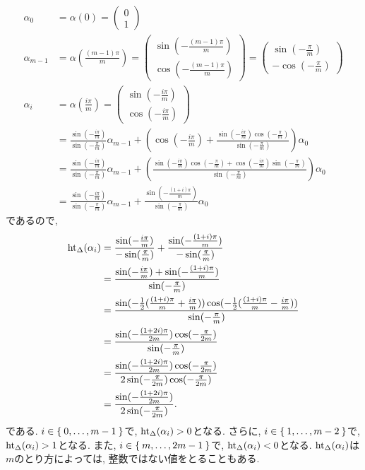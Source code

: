 \begin{align*}
  \alpha_0&=\alpha(0)=\begin{pmatrix}0\\1\end{pmatrix}\\
  \alpha_{m-1}&=\alpha(\frac{(m-1)\pi}{m})=
  \begin{pmatrix}\sin(-\frac{(m-1)\pi}{m})\\\cos(-\frac{(m-1)\pi}{m})\end{pmatrix}=
\begin{pmatrix}\sin(-\frac{\pi}{m})\\-\cos(-\frac{\pi}{m})\end{pmatrix}
  \\
  \alpha_{i}&=\alpha(\frac{i\pi}{m})=
  \begin{pmatrix}\sin(-\frac{i\pi}{m})\\\cos(-\frac{i\pi}{m})\end{pmatrix}\\
  &=
  \frac{\sin(-\frac{i\pi}{m})}{\sin(-\frac{\pi}{m})}\alpha_{m-1}
  +
  (\cos(-\frac{i\pi}{m})+\frac{\sin(-\frac{i\pi}{m})\cos(-\frac{\pi}{m})}{\sin(-\frac{\pi}{m})})\alpha_{0}\\
  &=
  \frac{\sin(-\frac{i\pi}{m})}{\sin(-\frac{\pi}{m})}\alpha_{m-1}
  +
  (\frac{\sin(-\frac{i\pi}{m})\cos(-\frac{\pi}{m})+\cos(-\frac{i\pi}{m})\sin(-\frac{\pi}{m})}{\sin(-\frac{\pi}{m})})\alpha_{0}\\
  &=
  \frac{\sin(-\frac{i\pi}{m})}{\sin(-\frac{\pi}{m})}\alpha_{m-1}
  +
  \frac{\sin(-\frac{(1+i)\pi}{m})}{\sin(-\frac{\pi}{m})}\alpha_{0}
\end{align*}
であるので,
\begin{align*}
  \operatorname{ht}_{\Delta}(\alpha_i)
  &=
  \frac{\sin(-\frac{i\pi}{m})}{-\sin(\frac{\pi}{m})}
  +
  \frac{\sin(-\frac{(1+i)\pi}{m})}{-\sin(\frac{\pi}{m})}\\
  &=
  \frac{\sin(-\frac{i\pi}{m})+\sin(-\frac{(1+i)\pi}{m})}{\sin(-\frac{\pi}{m})}\\
  &=
  \frac{\sin(-\frac{1}{2}(\frac{(1+i)\pi}{m}+\frac{i\pi}{m}))\cos(-\frac{1}{2}(\frac{(1+i)\pi}{m}-\frac{i\pi}{m}))}{\sin(-\frac{\pi}{m})}\\
  &=
  \frac{\sin(-\frac{(1+2i)\pi}{2m})\cos(-\frac{\pi}{2m})}{\sin(-\frac{\pi}{m})}\\
  &=
  \frac{\sin(-\frac{(1+2i)\pi}{2m})\cos(-\frac{\pi}{2m})}{2\sin(-\frac{\pi}{2m})\cos(-\frac{\pi}{2m})}\\
  &=
  \frac{\sin(-\frac{(1+2i)\pi}{2m})}{2\sin(-\frac{\pi}{2m})}.
\end{align*}
である.
$i\in \Set{0,\ldots,m-1}$で, $\operatorname{ht}_\Delta(\alpha_i)>0$となる.
さらに,
$i\in \Set{1,\ldots,m-2}$で, $\operatorname{ht}_\Delta(\alpha_i)>1$となる.
また,
$i\in \Set{m,\ldots,2m-1}$で, $\operatorname{ht}_\Delta(\alpha_i)<0$となる.
$\operatorname{ht}_\Delta(\alpha_i)$は$m$のとり方によっては, 整数ではない値をとることもある.

